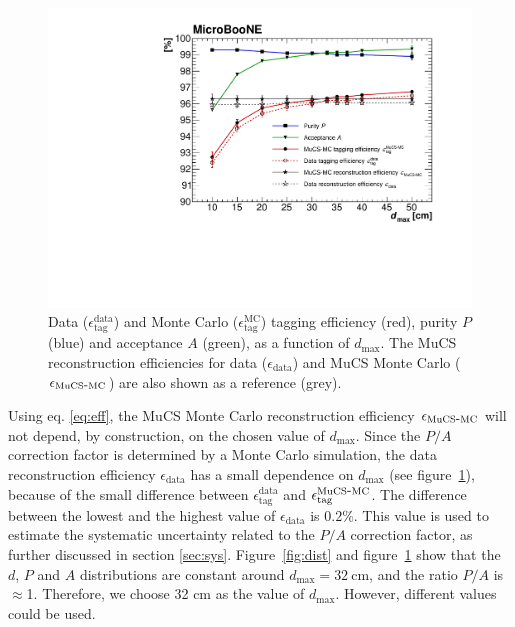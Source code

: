\documentclass[a4paper,11pt]{article}
\def\myhyphen{{\hbox{-}}}
\begin{document}
\begin{figure}[htbp]
  \begin{center}
    \includegraphics[width=0.7\linewidth]{figures/purity.pdf}
    \caption{Data ($\epsilon^{\mathrm{data}}_{\mathrm{tag}}$) and Monte Carlo ($\epsilon^{\mathrm{MC}}_{\mathrm{tag}}$) tagging efficiency (red), purity $P$ (blue) and acceptance $A$ (green), as a function of $d_{\mathrm{max}}$. The MuCS reconstruction efficiencies for data ($\epsilon_{\mathrm{data}}$) and MuCS Monte Carlo ($\epsilon_{\mathrm{MuCS\myhyphen MC}}$) are also shown as a reference (grey).} \label{fig:purity}
  \end{center}
\end{figure}

Using eq. \eqref{eq:eff}, the MuCS Monte Carlo reconstruction efficiency $\epsilon_{\mathrm{MuCS\myhyphen MC}}$ will not depend, by construction, on the chosen value of $d_{\mathrm{max}}$. Since the $P/A$ correction factor is determined by a Monte Carlo simulation, the data reconstruction efficiency $\epsilon_{\mathrm{data}}$ has a small dependence on $d_{\mathrm{max}}$ (see figure~\ref{fig:purity}), because of the small difference between $\epsilon^{\mathrm{data}}_{\mathrm{tag}}$ and $\epsilon^{\mathrm{MuCS\myhyphen MC}}_{\mathrm{tag}}$.
The difference between the lowest and the highest value of $\epsilon_{\mathrm{data}}$ is $0.2\%$. This value is used to estimate the systematic uncertainty related to the $P/A$ correction factor, as further discussed in section \ref{sec:sys}.
Figure~\ref{fig:dist} and figure~\ref{fig:purity} show that the $d$, $P$ and $A$ distributions are constant around $d_{\mathrm{max}}=32~\mathrm{cm}$, and the ratio $P/A$ is $\approx$1. Therefore, we choose 32 cm as the value of $d_{\mathrm{max}}$. However, different values could be used.

\end{document}
